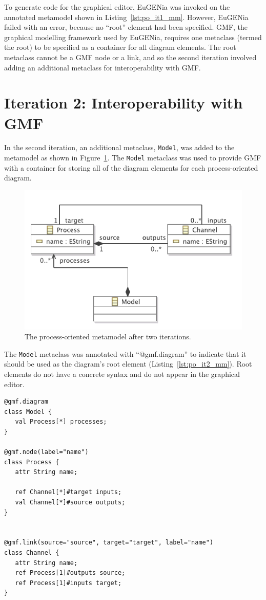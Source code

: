 To generate code for the graphical editor, EuGENia was invoked on the annotated metamodel shown in Listing~\ref{lst:po_it1_mm}. However, EuGENia failed with an error, because no ``root'' element had been specified. GMF, the graphical modelling framework used by EuGENia, requires one metaclass (termed the root) to be specified as a container for all diagram elements. The root metaclass cannot be a GMF node or a link, and so the second iteration involved adding an additional metaclass for interoperability with GMF.


\section{Iteration 2: Interoperability with GMF}
In the second iteration, an additional metaclass, \texttt{Model}, was added to the metamodel as shown in Figure~\ref{fig:po_it2_mm}. The \texttt{Model} metaclass was used to provide GMF with a container for storing all of the diagram elements for each process-oriented diagram.

\begin{figure}[htbp]
	\centering
		\includegraphics[scale=0.75]{A.2.ProcessOriented/images/2_mm.pdf}
	\caption{The process-oriented metamodel after two iterations.}
	\label{fig:po_it2_mm}
\end{figure}

The \texttt{Model} metaclass was annotated with ``@gmf.diagram'' to indicate that it should be used as the diagram's root element (Listing~\ref{lst:po_it2_mm}). Root elements do not have a concrete syntax and do not appear in the graphical editor.

\begin{lstlisting}[caption=The annotated process-oriented metamodel after two iterations, label=lst:po_it2_mm, language=Emfatic, float=tbp]
@gmf.diagram
class Model {
   val Process[*] processes;
}

@gmf.node(label="name")
class Process {
   attr String name;
      
   ref Channel[*]#target inputs;
   val Channel[*]#source outputs; 
}


@gmf.link(source="source", target="target", label="name")
class Channel { 
   attr String name;
   ref Process[1]#outputs source;
   ref Process[1]#inputs target;
}
\end{lstlisting}

